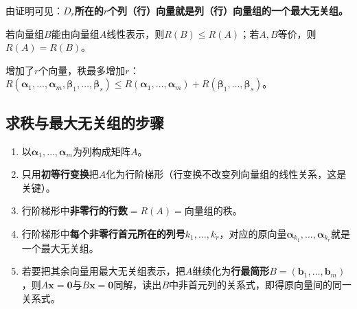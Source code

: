 由证明可见：\textbf{$D_r$所在的$r$个列（行）向量就是列（行）向量组的一个最大无关组。}

\begin{theorem}
若向量组$B$能由向量组$A$线性表示，则$R(B)\le R(A)$；若$A,B$等价，则$R(A)=R(B)$。
\end{theorem}

增加了$r$个向量，秩最多增加$r$：$R(\boldsymbol{\alpha}_1,\dots,\boldsymbol{\alpha}_m,\boldsymbol{\beta}_1,\dots,\boldsymbol{\beta}_s)\le R(\boldsymbol{\alpha}_1,\dots,\boldsymbol{\alpha}_m)+R(\boldsymbol{\beta}_1,\dots,\boldsymbol{\beta}_s)$。

\subsection{求秩与最大无关组的步骤}
\begin{enumerate}
    \item 以$\boldsymbol{\alpha}_1,\dots,\boldsymbol{\alpha}_m$为列构成矩阵$A$。
    \item 只用\textbf{初等行变换}把$A$化为行阶梯形（行变换不改变列向量组的线性关系，这是关键）。
    \item 行阶梯形中\textbf{非零行的行数}$=R(A)=$向量组的秩。
    \item 行阶梯形中\textbf{每个非零行首元所在的列号}$k_1,\dots,k_r$，对应的原向量$\boldsymbol{\alpha}_{k_1},\dots,\boldsymbol{\alpha}_{k_r}$就是一个最大无关组。
    \item 若要把其余向量用最大无关组表示，把$A$继续化为\textbf{行最简形}$B=(\boldsymbol{b}_1,\dots,\boldsymbol{b}_m)$，则$A\boldsymbol{x}=\boldsymbol{0}$与$B\boldsymbol{x}=\boldsymbol{0}$同解，读出$B$中非首元列的关系式，即得原向量间的同一关系式。
\end{enumerate}




